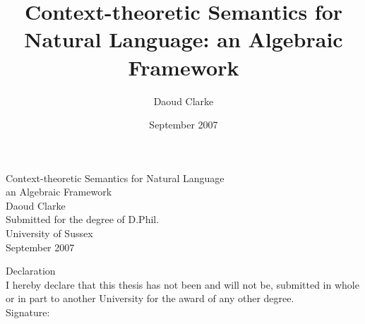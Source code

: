 \documentclass[a4paper,oneside,12pt]{report}
\title{Context-theoretic Semantics for Natural Language: an Algebraic Framework}
\author{Daoud Clarke}
\date{September 2007}
\begin{document}
\begin{titlepage}
\vspace*{2.5cm}\noindent
{\cmtitle Context-theoretic Semantics for Natural Language}\\
{\cmsection an Algebraic Framework}
\vspace{0.5cm}\\
\large{Daoud Clarke}
\vspace{0.5cm}\\
\large{Submitted for the degree of D.Phil.}\\
\large{University of Sussex}\\
\large{September 2007}
\end{titlepage}

\begin{titlepage}
\vspace*{2.5cm}\noindent
{\cmsection Declaration}
\vspace{0.5cm}\\
\noindent
I hereby declare that this thesis has not been and will not be, submitted in whole or in part to another University for the award of any other degree.
\vspace{2cm}\\
\noindent Signature:
\end{titlepage}
\end{document}
